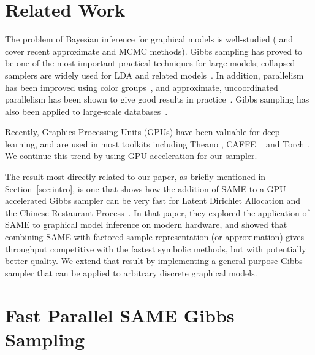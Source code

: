 \documentclass{article} %
\begin{document}
\section{Related Work}\label{sec:related_work}

The problem of Bayesian inference for graphical models is  well-studied (\citet{Koller2009}
and~\citet{Wainwright2008} cover recent approximate and MCMC methods). Gibbs sampling has proved to
be one of the most important practical techniques for large models; collapsed samplers are widely
used for LDA and related models~\citep{Griffiths_Steyvers}. In addition, parallelism has been
improved using color groups~\citep{Gonzalez2011}, and approximate, uncoordinated parallelism has
been shown to give good results in practice~\citep{Johnson2013}.  Gibbs sampling has also been
applied to large-scale databases~\citep{Zhang2013}.

Recently, Graphics Processing Units (GPUs) have been valuable for deep learning, and are used in
most toolkits including Theano \citep{Theano2012}, CAFFE ~\citep{jia2014caffe} and Torch
\citep{Torch}. We continue this trend by using GPU acceleration for our sampler.

The result most directly related to our paper, as briefly mentioned in Section~\ref{sec:intro}, is
one that shows how the addition of SAME to a GPU-accelerated Gibbs sampler can be very fast for
Latent Dirichlet Allocation and the Chinese Restaurant Process~\citep{SAME2015}. In that paper, they
explored the application of SAME to graphical model inference on modern hardware, and showed that
combining SAME with factored sample representation (or approximation) gives throughput competitive
with the fastest symbolic methods, but with potentially better quality. We extend that result by
implementing a general-purpose Gibbs sampler that can be applied to arbitrary discrete graphical
models.





\section{Fast Parallel SAME Gibbs Sampling}\label{sec:same}
\end{document}
